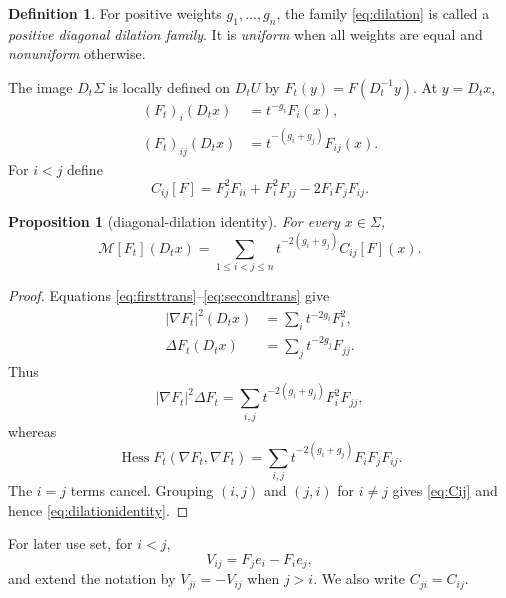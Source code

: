 \documentclass[preprint,12pt]{elsarticle}
\numberwithin{equation}{section}
\newtheorem{proposition}[theorem]{Proposition}
\theoremstyle{definition}\newtheorem{definition}[theorem]{Definition}
\theoremstyle{remark}\newtheorem{remark}[theorem]{Remark}
\begin{document}
\begin{definition}\label{def:dilation}
For positive weights $g_1,\ldots,g_n$, the family \eqref{eq:dilation} is called a \emph{positive diagonal dilation family}. It is \emph{uniform} when all weights are equal and \emph{nonuniform} otherwise.
\end{definition}

The image $D_t\Sigma$ is locally defined on $D_tU$ by $F_t(y)=F(D_t^{-1}y)$. At $y=D_tx$,
\begin{align}
(F_t)_i(D_tx)&=t^{-g_i}F_i(x),\label{eq:firsttrans}\\
(F_t)_{ij}(D_tx)&=t^{-(g_i+g_j)}F_{ij}(x).\label{eq:secondtrans}
\end{align}
For $i<j$ define
\begin{equation}\label{eq:Cij}
C_{ij}[F]=F_j^2F_{ii}+F_i^2F_{jj}-2F_iF_jF_{ij}.
\end{equation}

\begin{proposition}[diagonal-dilation identity]\label{prop:dilationidentity}
For every $x\in\Sigma$,
\begin{equation}\label{eq:dilationidentity}
\mathcal M[F_t](D_tx)=\sum_{1\le i<j\le n}t^{-2(g_i+g_j)}C_{ij}[F](x).
\end{equation}
\end{proposition}
\begin{proof}
Equations \eqref{eq:firsttrans}--\eqref{eq:secondtrans} give
\begin{align}
|\nabla F_t|^2(D_tx)&=\sum_i t^{-2g_i}F_i^2,\label{eq:gradtrans}\\
\Delta F_t(D_tx)&=\sum_j t^{-2g_j}F_{jj}.\label{eq:laptrans}
\end{align}
Thus
\begin{equation}\label{eq:producttrans}
|\nabla F_t|^2\Delta F_t=\sum_{i,j}t^{-2(g_i+g_j)}F_i^2F_{jj},
\end{equation}
whereas
\begin{equation}\label{eq:hesstrans}
\operatorname{Hess}F_t(\nabla F_t,\nabla F_t)=\sum_{i,j}t^{-2(g_i+g_j)}F_iF_jF_{ij}.
\end{equation}
The $i=j$ terms cancel. Grouping $(i,j)$ and $(j,i)$ for $i\ne j$ gives \eqref{eq:Cij} and hence \eqref{eq:dilationidentity}.
\end{proof}

For later use set, for $i<j$,
\begin{equation}\label{eq:Vij}
V_{ij}=F_je_i-F_ie_j,
\end{equation}
and extend the notation by $V_{ji}=-V_{ij}$ when $j>i$. We also write $C_{ji}=C_{ij}$.
\end{document}
